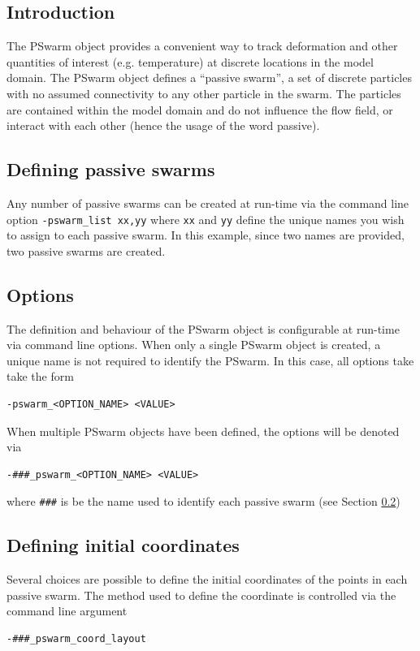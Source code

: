 \documentclass[paper=a4, fontsize=11pt,twoside]{scrartcl}
\begin{document}
{{\subsection{Introduction}

The PSwarm object provides a convenient way to track deformation and other quantities of interest (e.g. temperature)
at discrete locations in the model domain. 
The PSwarm object defines a ``passive swarm'', a set of discrete particles with no assumed connectivity to
any other particle in the swarm. The particles are contained within the model domain and do not influence the flow field, 
or interact with each other (hence the usage of the word passive).

\subsection{Defining passive swarms} \label{sec:def_pswarm}
Any number of passive swarms can be created at run-time via the command line option
\texttt{-pswarm\_list xx,yy}
where \texttt{xx} and \texttt{yy} define the unique names you wish to assign to each passive swarm.
In this example, since two names are provided, two passive swarms are created.

\subsection{Options}
The definition and behaviour of the PSwarm object is configurable at run-time via command line options.
When only a single PSwarm object is created, a unique name is not required to identify the PSwarm.
In this case, all options take take the form
\begin{lstlisting}
-pswarm_<OPTION_NAME> <VALUE>
\end{lstlisting}
When multiple PSwarm objects have been defined, the options will be denoted via
\begin{lstlisting}
-###_pswarm_<OPTION_NAME> <VALUE>
\end{lstlisting}
where \texttt{\#\#\#} is be the name used to identify each passive swarm (see Section \ref{sec:def_pswarm})




\subsection{Defining initial coordinates}

Several choices are possible to define the initial coordinates of the points in each passive swarm.
The method used to define the coordinate is controlled via the command line argument
\begin{lstlisting}
-###_pswarm_coord_layout
\end{lstlisting}

}}
\end{document}
